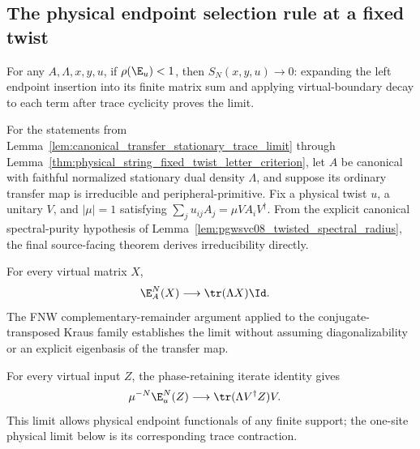 \subsection{The physical endpoint selection rule at a fixed twist}

\begin{lemma}
    \label{lem:physical_string_spectral_decay}
    \leanok
    For any $A,\Lambda,x,y,u$, if $\rho(\E_u)<1$, then
    $S_N(x,y,u)\to0$: expanding the left endpoint insertion into its finite
    matrix sum and applying virtual-boundary decay to each term after trace
    cyclicity proves the limit.
\end{lemma}

For the statements from Lemma~\ref{lem:canonical_transfer_stationary_trace_limit}
through Lemma~\ref{thm:physical_string_fixed_twist_letter_criterion},
let $A$ be canonical with faithful normalized
stationary dual density $\Lambda$, and suppose its ordinary transfer map is
irreducible and peripheral-primitive.  Fix a physical twist $u$, a unitary
$V$, and $|\mu|=1$ satisfying
$\sum_j u_{ij}A_j=\mu V A_iV^\dagger$.
From the explicit canonical spectral-purity hypothesis of
Lemma~\ref{lem:pgwsvc08_twisted_spectral_radius}, the final source-facing
theorem derives irreducibility directly.

\begin{lemma}
    \label{lem:canonical_transfer_stationary_trace_limit}
    \leanok
    For every virtual matrix $X$,
    \begin{align}
        \E_A^N(X) & \longrightarrow\tr(\Lambda X)\Id.
        \notag
    \end{align}
    The FNW complementary-remainder argument applied to the
    conjugate-transposed Kraus family establishes the limit without assuming
    diagonalizability or an explicit eigenbasis of the transfer map.
\end{lemma}

\begin{lemma}
    \label{lem:twisted_transfer_vector_phase_limit}
    \leanok
    For every virtual input $Z$, the phase-retaining iterate identity gives
    \begin{align}
        \mu^{-N}\E_u^N(Z) & \longrightarrow\tr(\Lambda V^\dagger Z)V.
        \notag
    \end{align}
    This limit allows physical endpoint functionals of any finite support;
    the one-site physical limit below is its corresponding trace contraction.
\end{lemma}

